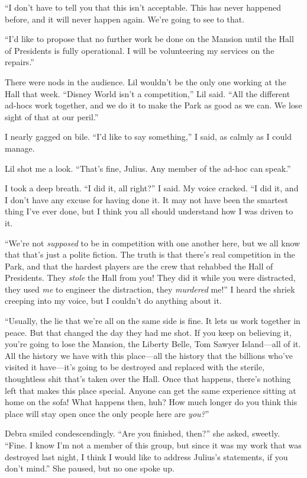 “I don't have to tell you that this isn't acceptable. This has
never happened before, and it will never happen again. We're going
to see to that.

“I'd like to propose that no further work be done on the Mansion
until the Hall of Presidents is fully operational. I will be
volunteering my services on the repairs.”

There were nods in the audience. Lil wouldn't be the only one
working at the Hall that week. “Disney World isn't a competition,”
Lil said. “All the different ad-hocs work together, and we do it to
make the Park as good as we can. We lose sight of that at our
peril.”

I nearly gagged on bile. “I'd like to say something,” I said, as
calmly as I could manage.

Lil shot me a look. “That's fine, Julius. Any member of the ad-hoc
can speak.”

I took a deep breath. “I did it, all right?” I said. My voice
cracked. “I did it, and I don't have any excuse for having done it.
It may not have been the smartest thing I've ever done, but I think
you all should understand how I was driven to it.

“We're not \emph{supposed} to be in competition with one another
here, but we all know that that's just a polite fiction. The truth
is that there's real competition in the Park, and that the hardest
players are the crew that rehabbed the Hall of Presidents. They
\emph{stole} the Hall from you! They did it while you were
distracted, they used \emph{me} to engineer the distraction, they
\emph{murdered} me!” I heard the shriek creeping into my voice, but
I couldn't do anything about it.

“Usually, the lie that we're all on the same side is fine. It lets
us work together in peace. But that changed the day they had me
shot. If you keep on believing it, you're going to lose the
Mansion, the Liberty Belle, Tom Sawyer Island—all of it. All the
history we have with this place—all the history that the billions
who've visited it have—it's going to be destroyed and replaced with
the sterile, thoughtless shit that's taken over the Hall. Once that
happens, there's nothing left that makes this place special. Anyone
can get the same experience sitting at home on the sofa! What
happens then, huh? How much longer do you think this place will
stay open once the only people here are \emph{you?}”

Debra smiled condescendingly. “Are you finished, then?” she asked,
sweetly. “Fine. I know I'm not a member of this group, but since it
was my work that was destroyed last night, I think I would like to
address Julius's statements, if you don't mind.” She paused, but no
one spoke up.

